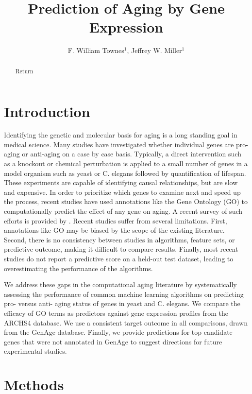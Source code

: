 \documentclass{article}
\begin{document}
\title{Prediction of Aging by Gene Expression}

\author{F. William Townes$^{1}$, Jeffrey W. Miller$^{1}$}%
\affil{\footnotesize $^{1}$Department of Biostatistics, Harvard T.H. Chan School of Public Health, Boston, MA \\%
\normalsize {ftownes@g.harvard.edu, jwmiller@hsph.harvard.edu}
}
\maketitle

\newpage
\begin{abstract}
Return
\end{abstract}

\section{Introduction}
Identifying the genetic and molecular basis for aging is a long standing goal in medical science. Many studies have investigated whether individual genes are pro-aging or anti-aging on a case by case basis. Typically, a direct intervention such as a knockout or chemical perturbation is applied to a small number of genes in a model organism such as yeast or C. elegans followed by quantification of lifespan. These experiments are capable of identifying causal relationships, but are slow and expensive. In order to prioritize which genes to examine next and speed up the process, recent studies have used annotations like the Gene Ontology (GO) to computationally predict the effect of any gene on aging. A recent survey of such efforts is provided by \cite{fabris_review_2017}. Recent studies suffer from several limitations. First, annotations like GO may be biased by the scope of the existing literature. Second, there is no consistency between studies in algorithms, feature sets, or predictive outcome, making it difficult to compare results. Finally, most recent studies do not report a predictive score on a held-out test dataset, leading to overestimating the performance of the algorithms.

We address these gaps in the computational aging literature by systematically assessing the performance of common machine learning algorithms on predicting pro- versus anti- aging status of genes in yeast and C. elegans. We compare the efficacy of GO terms as predictors against gene expression profiles from the ARCHS4 database. We use a consistent target outcome in all comparisons, drawn from the GenAge database. Finally, we provide predictions for top candidate genes that were not annotated in GenAge to suggest directions for future experimental studies.

\section{Methods}



\end{document}

